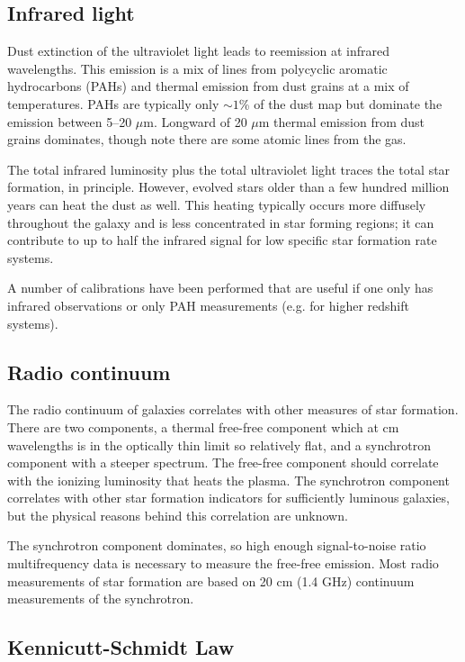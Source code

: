 \subsection{Infrared light}

Dust extinction of the ultraviolet light leads to reemission at
infrared wavelengths. This emission is a mix of lines from polycyclic
aromatic hydrocarbons (PAHs) and thermal emission from dust grains at
a mix of temperatures. PAHs are typically only $\sim 1$\% of the dust
map but dominate the emission between 5--20 $\mu$m. Longward of 20
$\mu$m thermal emission from dust grains dominates, though note there
are some atomic lines from the gas.

The total infrared luminosity plus the total ultraviolet light traces
the total star formation, in principle. However, evolved stars older
than a few hundred million years can heat the dust as well. This
heating typically occurs more diffusely throughout the galaxy and is
less concentrated in star forming regions; it can contribute to up to
half the infrared signal for low specific star formation rate
systems.

A number of calibrations have been performed that are useful if one
only has infrared observations or only PAH measurements (e.g. for
higher redshift systems).

\subsection{Radio continuum}

The radio continuum of galaxies correlates with other measures of star
formation. There are two components, a thermal free-free component
which at cm wavelengths is in the optically thin limit so relatively
flat, and a synchrotron component with a steeper spectrum. The
free-free component should correlate with the ionizing luminosity that
heats the plasma. The synchrotron component correlates with other star
formation indicators for sufficiently luminous galaxies, but the
physical reasons behind this correlation are unknown.

The synchrotron component dominates, so high enough signal-to-noise
ratio multifrequency data is necessary to measure the free-free
emission. Most radio measurements of star formation are based on 20 cm
(1.4 GHz) continuum measurements of the synchrotron.

\subsection{Kennicutt-Schmidt Law}

